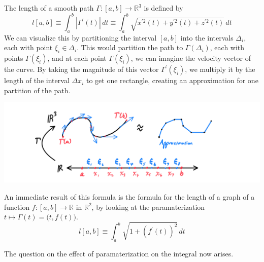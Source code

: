     \begin{definition}
      The length of a smooth path $\Gamma: [a, b] \longrightarrow \mathbb{R}^3$ is defined by 
      \[l[a, b] \equiv \int_a^b |\Gamma^\prime (t)|\,dt \equiv \int_a^b \sqrt{x^{\prime 2} (t) + y^{\prime 2} (t) + z^{\prime 2} (t)}\, dt\]
      We can visualize this by partitioning the interval $[a, b]$ into the intervals $\Delta_i$, each with point $\xi_i \in \Delta_i$. This would partition the path to $\Gamma(\Delta_i)$, each with points $\Gamma(\xi_i)$, and at each point $\Gamma(\xi_i)$, we can imagine the velocity vector of the curve. By taking the magnitude of this vector $\Gamma^\prime (\xi_i)$, we multiply it by the length of the interval $\Delta x_i$ to get one rectangle, creating an approximation for one partition of the path. 
      \begin{center}
          \includegraphics[scale=0.25]{img/Arc_Length_Integral.PNG}
      \end{center}
      An immediate result of this formula is the formula for the length of a graph of a function $f: [a, b] \longrightarrow \mathbb{R}$ in $\mathbb{R}^2$, by looking at the paramaterization $t \mapsto \Gamma(t) = \big(t, f(t)\big)$. 
      \[l[a,b] \equiv \int_a^b \sqrt{1 + (f^\prime (t))^2}\,dt\]
    \end{definition}

    The question on the effect of paramaterization on the integral now arises. 

